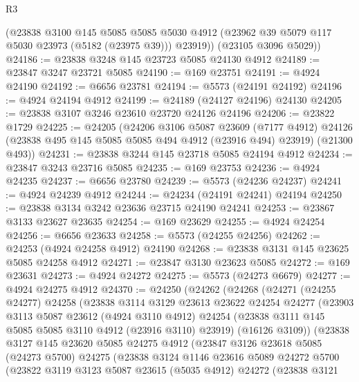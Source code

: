 \begin{lexlean}{R3}
\begin{coremodule}
        (@23838
          @3100
          @145
          @5085
          @5085
          @5030
          @4912
          (@23962 @39 @5079 @117 @5030 @23973 (@5182 (@23975 @39)))
          @23919))
      (@23105 @3096 @5029))
@24186 := @23838 @3248 @145 @23723 @5085 @24130 @4912
@24189 := @23847 @3247 @23721 @5085
@24190 := @169 @23751
@24191 := @4924 @24190
@24192 := @6656 @23781
@24194 := @5573 (@24191 @24192)
@24196 := @4924 @24194 @4912
@24199 := @24189 (@24127 @24196) @24130
@24205 := @23838 @3107 @3246 @23610 @23720 @24126 @24196
@24206 := @23822 @1729
@24225 := @24205
    (@24206
      @3106
      @5087
      @23609
      (@7177 @4912)
      @24126
      (@23838 @495 @145 @5085 @5085 @494 @4912 (@23916 @494) @23919)
      (@21300 @493))
@24231 := @23838 @3244 @145 @23718 @5085 @24194 @4912
@24234 := @23847 @3243 @23716 @5085
@24235 := @169 @23753
@24236 := @4924 @24235
@24237 := @6656 @23780
@24239 := @5573 (@24236 @24237)
@24241 := @4924 @24239 @4912
@24244 := @24234 (@24191 @24241) @24194
@24250 := @23838 @3134 @3242 @23636 @23715 @24190 @24241
@24253 := @23867 @3133 @23627 @23635
@24254 := @169 @23629
@24255 := @4924 @24254
@24256 := @6656 @23633
@24258 := @5573 (@24255 @24256)
@24262 := @24253 (@4924 @24258 @4912) @24190
@24268 := @23838 @3131 @145 @23625 @5085 @24258 @4912
@24271 := @23847 @3130 @23623 @5085
@24272 := @169 @23631
@24273 := @4924 @24272
@24275 := @5573 (@24273 @6679)
@24277 := @4924 @24275 @4912
@24370 := @24250
    (@24262
      (@24268
        (@24271
          (@24255 @24277)
          @24258
          (@23838
            @3114
            @3129
            @23613
            @23622
            @24254
            @24277
            (@23903
              @3113
              @5087
              @23612
              (@4924 @3110 @4912)
              @24254
              (@23838 @3111 @145 @5085 @5085 @3110 @4912 (@23916 @3110) @23919)
              (@16126 @3109))
            (@23838
              @3127
              @145
              @23620
              @5085
              @24275
              @4912
              (@23847
                @3126
                @23618
                @5085
                (@24273 @5700)
                @24275
                (@23838
                  @3124
                  @1146
                  @23616
                  @5089
                  @24272
                  @5700
                  (@23822
                    @3119
                    @3123
                    @5087
                    @23615
                    (@5035 @4912)
                    @24272
                    (@23838
                      @3121

\end{coremodule}
\end{lexlean}
